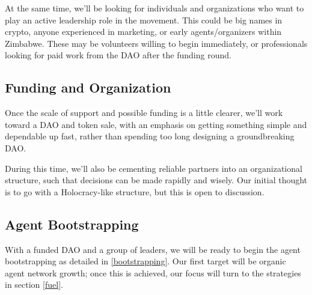 \documentclass{article}
\begin{document}
At the same time, we'll be looking for individuals and organizations who want to play an active leadership role in the movement. This could be big names in crypto, anyone experienced in marketing, or early agents/organizers within Zimbabwe. These may be volunteers willing to begin immediately, or professionals looking for paid work from the DAO after the funding round.

\subsection{Funding and Organization} \label{funding and organization}

Once the scale of support and possible funding is a little clearer, we'll work toward a DAO and token sale, with an emphasis on getting something simple and dependable up fast, rather than spending too long designing a groundbreaking DAO.

During this time, we'll also be cementing reliable partners into an organizational structure, such that decisions can be made rapidly and wisely. Our initial thought is to go with a Holocracy-like structure, but this is open to discussion.

\subsection{Agent Bootstrapping} \label{agent bootstrapping}

With a funded DAO and a group of leaders, we will be ready to begin the agent bootstrapping as detailed in \ref{bootstrapping}. Our first target will be organic agent network growth; once this is achieved, our focus will turn to the strategies in section \ref{fuel}.
\end{document}
